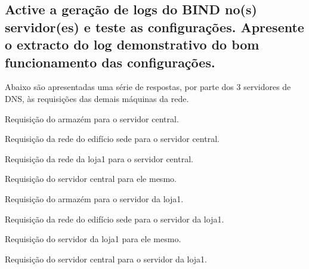 \documentclass[a4paper,12pt]{article}
\begin{document}
\subsection{Active a geração de logs do BIND no(s) servidor(es) e teste as configurações.
Apresente o extracto do log demonstrativo do bom funcionamento das
configurações.}

Abaixo são apresentadas uma série de respostas, por parte dos 3 servidores de DNS, às requisições das demais máquinas da rede.

\begin{program}
   
   \caption{Requisição do armazém para o servidor central.}
   \label{verb:a_s}
\end{program}

\begin{program}
   
   \caption{Requisição da rede do edifício sede para o servidor central.}
   \label{verb:e_s}
\end{program}

\begin{program}
   
   \caption{Requisição da rede da loja1 para o servidor central.}
   \label{verb:l_s}
\end{program}

\begin{program}
   
   \caption{Requisição do servidor central para ele mesmo.}
   \label{verb:s_s}
\end{program}

\begin{program}
   
   \caption{Requisição do armazém para o servidor da loja1.}
   \label{verb:a_l}
\end{program}

\begin{program}
   
   \caption{Requisição da rede do edifício sede para o servidor da loja1.}
   \label{verb:e_l}
\end{program}

\begin{program}
   
   \caption{Requisição do servidor da loja1 para ele mesmo.}
   \label{verb:l_l}
\end{program}

\begin{program}
   
   \caption{Requisição do servidor central para o servidor da loja1.}
   \label{verb:s_l}
\end{program}
\end{document}
